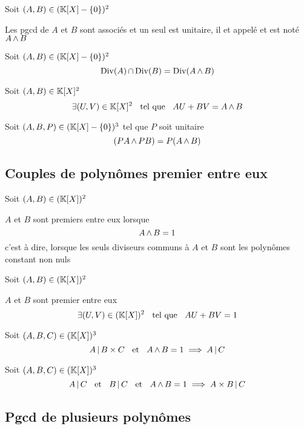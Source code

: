 \begin{thm}
  Soit $(A, B) \in (\mathbb{K}[X] - \{0\})^2$

  Les pgcd de $A$ et $B$ sont associés et un seul est
  unitaire, il et appelé 
  et est noté $A \operatorname{\wedge} B$
\end{thm}

\begin{thm}
  Soit $(A, B) \in (\mathbb{K}[X] - \{0\})^2$
  \[
    \operatorname{\mathrm{Div}}(A) \operatorname{\cap} \operatorname{\mathrm{Div}}(B) = \operatorname{\mathrm{Div}}(A \operatorname{\wedge} B)
  \]
\end{thm}

\begin{prp}[Bézout]
  Soit $(A, B) \in \mathbb{K}[X]^2$
  \[
    \exists (U, V) \in \mathbb{K}[X]^2 \;\;\text{ tel que }\;\; A U + B V = A \operatorname{\wedge} B
  \]
\end{prp}

\begin{prp}
  Soit $(A, B, P) \in (\mathbb{K}[X] - \{0\})^3$ tel que $P$ soit unitaire
  \[
    (P A \operatorname{\wedge} P B) = P (A \operatorname{\wedge} B)
  \]
\end{prp}

\subsection{Couples de polynômes premier entre eux}

\begin{dfn}
Soit $(A, B) \in (\mathbb{K}[X])^2$

$A$ et $B$ sont premiers entre eux lorsque
\[
    A \operatorname{\wedge} B = 1
\]
c'est à dire, lorsque les seuls diviseurs communs à $A$ et $B$ sont les
polynômes constant non nuls
\end{dfn}

\begin{thm}[Bézout]
Soit $(A, B) \in (\mathbb{K}[X])^2$

$A$ et $B$ sont premier entre eux \ssi
\[
    \exists (U, V) \in (\mathbb{K}[X])^2 \;\;\text{ tel que }\;\; A U + B V = 1
\]
\end{thm}

\begin{thm}
Soit $(A, B, C) \in (\mathbb{K}[X])^3$
\[
    A \operatorname{|} B \times C \;\;\text{ et }\;\; A \operatorname{\wedge} B = 1 \implies A \operatorname{|} C
\]
\end{thm}

\begin{prp}
Soit $(A, B, C) \in (\mathbb{K}[X])^3$
\[
    A \operatorname{|} C \;\;\text{ et }\;\; B \operatorname{|} C \;\;\text{ et }\;\; A \operatorname{\wedge} B = 1 \implies A \times B
    \operatorname{|} C
\]
\end{prp}

\subsection{Pgcd de plusieurs polynômes}

